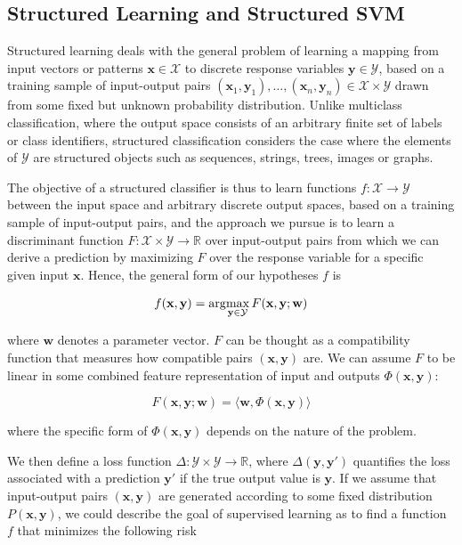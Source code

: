 \subsection{Structured Learning and Structured SVM}
Structured learning deals with the general problem of learning a mapping
from input vectors or patterns $\mathbf{x}\in\mathcal{X}$ to discrete
response variables $\mathbf{y}\in\mathcal{Y}$, based on a training
sample of input-output pairs $(\mathbf{x}_{1},\mathbf{y}_{1}),\ldots,(\mathbf{x}_{n},\mathbf{y}_{n})\in\mathcal{X}\times\mathcal{Y}$
drawn from some fixed but unknown probability distribution. Unlike
multiclass classification, where the output space consists of an arbitrary
finite set of labels or class identifiers, structured classification
considers the case where the elements of $\mathcal{Y}$ are structured
objects such as sequences, strings, trees, images or graphs. 

The objective of a structured classifier is thus to learn functions $f:\mathcal{X}\rightarrow\mathit{\mathcal{Y}}$
between the input space and arbitrary discrete output spaces, based
on a training sample of input-output pairs, and the approach we pursue
is to learn a discriminant function $F:\mathcal{X}\times\mathit{\mathcal{Y}\rightarrow\mathbb{R}}$
over input-output pairs from which we can derive a prediction by maximizing
$F$ over the response variable for a specific given input $\mathbf{x}$. Hence, the general form of our hypotheses $f$ is

\begin{equation}
f(\mathbf{x},\mathbf{y}) =\arg\!\max_{\mathbf{y} \in \mathcal{Y}} F(\mathbf{x},\mathbf{y};\mathbf{w})
\end{equation}

where $\mathbf{w}$ denotes a parameter vector. $F$ can be thought as a compatibility function that measures how compatible pairs $(\mathbf{x},\mathbf{y})$ are. We can assume $F$ to be linear in some combined feature representation of input and outputs $\Phi(\mathbf{x},\mathbf{y})$:

\begin{equation}
F(\mathbf{x},\mathbf{y};\mathbf{w}) = \langle \mathbf{w}, \Phi(\mathbf{x},\mathbf{y}) \rangle
\end{equation}

where the specific form of $\Phi(\mathbf{x},\mathbf{y})$ depends on the nature of the problem.

We then define a loss function $\Delta : \mathcal{Y} \times \mathcal{Y} \rightarrow \mathbb{R}$, where $\Delta(\mathbf{y},\mathbf{y'})$ quantifies the loss associated with a prediction $\mathbf{y'}$ if the true output value is $\mathbf{y}$. If we assume that input-output pairs $(\mathbf{x},\mathbf{y})$ are generated according to some fixed distribution $P(\mathbf{x},\mathbf{y})$, we could describe the goal of supervised learning as to find a function $f$ that minimizes the following risk


